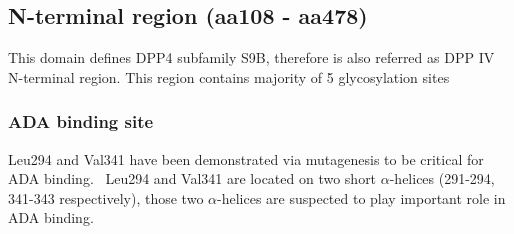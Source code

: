 \subsection{N-terminal region (aa108 - aa478)}

This domain defines DPP4 subfamily S9B, therefore is also referred as DPP IV N-terminal region. This region contains majority of 5 glycosylation sites 

\subsubsection{ADA binding site}
Leu294 and Val341 have been demonstrated via mutagenesis to be critical for ADA binding.~\cite{Abbott_1999} Leu294 and Val341 are located on two short $\alpha$-helices (291-294, 341-343 respectively), those two $\alpha$-helices are suspected to play important role in ADA binding. 